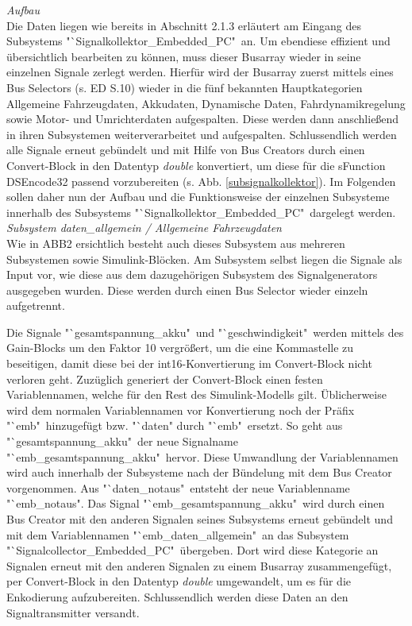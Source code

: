 \documentclass[fontsize = 12pt, paper = a4]{scrreprt}
\begin{document}

\textit{Aufbau} \\

Die Daten liegen wie bereits in Abschnitt 2.1.3 erläutert am Eingang des Subsystems "`Signalkollektor\_Embedded\_PC"\ an. Um ebendiese effizient und übersichtlich bearbeiten zu können, muss dieser Busarray wieder in seine einzelnen Signale zerlegt werden. Hierfür wird der Busarray zuerst mittels eines Bus Selectors (s. ED S.10) wieder in die fünf bekannten Hauptkategorien Allgemeine Fahrzeugdaten, Akkudaten, Dynamische Daten, Fahrdynamikregelung sowie Motor- und Umrichterdaten aufgespalten. Diese werden dann anschließend in ihren Subsystemen weiterverarbeitet und aufgespalten. Schlussendlich werden alle Signale erneut gebündelt und mit Hilfe von Bus Creators durch einen Convert-Block in den Datentyp \textit{double} konvertiert, um diese für die sFunction DSEncode32 passend vorzubereiten (s. Abb. \ref{subsignalkollektor}). Im Folgenden sollen daher nun der Aufbau und die Funktionsweise der einzelnen Subsysteme innerhalb des Subsystems "`Signalkollektor\_Embedded\_PC"\ dargelegt werden. \\


\textit{Subsystem daten\_allgemein / Allgemeine Fahrzeugdaten} \\

Wie in ABB2 ersichtlich besteht auch dieses Subsystem aus mehreren Subsystemen sowie Simulink-Blöcken. Am Subsystem selbst liegen die Signale als Input vor, wie diese aus dem dazugehörigen Subsystem des Signalgenerators ausgegeben wurden. Diese werden durch einen Bus Selector wieder einzeln aufgetrennt.

\newpage

Die Signale "`gesamtspannung\_akku"\ und "`geschwindigkeit"\ werden mittels des Gain-Blocks um den Faktor 10 vergrößert, um die eine Kommastelle zu beseitigen, damit diese bei der int16-Konvertierung im Convert-Block nicht verloren geht. Zuzüglich generiert der Convert-Block einen festen Variablennamen, welche für den Rest des Simulink-Modells gilt. Üblicherweise wird dem normalen Variablennamen vor Konvertierung noch der Präfix "`emb"\ hinzugefügt bzw. "`daten" durch "`emb"\ ersetzt. So geht aus "`gesamtspannung\_akku"\ der neue Signalname "`emb\_gesamtspannung\_akku"\ hervor. Diese Umwandlung der Variablennamen wird auch innerhalb der Subsysteme nach der Bündelung mit dem Bus Creator vorgenommen. Aus "`daten\_notaus"\ entsteht der neue Variablenname "`emb\_notaus". Das Signal "`emb\_gesamtspannung\_akku"\ wird durch einen Bus Creator mit den anderen Signalen seines Subsystems erneut gebündelt und mit dem Variablennamen "`emb\_daten\_allgemein"\ an das Subsystem "`Signalcollector\_Embedded\_PC"\ übergeben. Dort wird diese Kategorie an Signalen erneut mit den anderen Signalen zu einem Busarray zusammengefügt, per Convert-Block in den Datentyp \textit{double} umgewandelt, um es für die Enkodierung aufzubereiten. Schlussendlich werden diese Daten an den Signaltransmitter versandt. 
\end{document}
